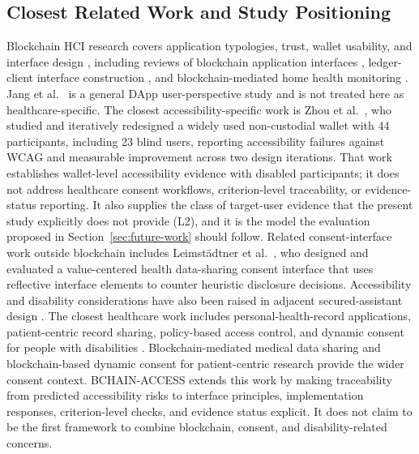\documentclass[journal]{IEEEtran}
\begin{document}
\subsection{Closest Related Work and Study Positioning}
Blockchain HCI research covers application typologies, trust, wallet usability, and interface design \cite{elsden2018making,frohlich2022blockchain,Glomann2019ImprovingTB,tharani2022ui}, including reviews of blockchain application interfaces \cite{tharatipyakul2021user}, ledger-client interface construction \cite{hossain2020designing}, and blockchain-mediated home health monitoring \cite{rahman2020natural}. Jang et al.~\cite{jang2020user} is a general DApp user-perspective study and is not treated here as healthcare-specific. The closest accessibility-specific work is Zhou et al.~\cite{zhou2023accessible}, who studied and iteratively redesigned a widely used non-custodial wallet with 44 participants, including 23 blind users, reporting accessibility failures against WCAG and measurable improvement across two design iterations. That work establishes wallet-level accessibility evidence with disabled participants; it does not address healthcare consent workflows, criterion-level traceability, or evidence-status reporting. It also supplies the class of target-user evidence that the present study explicitly does not provide (L2), and it is the model the evaluation proposed in Section~\ref{sec:future-work} should follow. Related consent-interface work outside blockchain includes Leimst\"adtner et al.~\cite{leimstadtner2024value}, who designed and evaluated a value-centered health data-sharing consent interface that uses reflective interface elements to counter heuristic disclosure decisions. Accessibility and disability considerations have also been raised in adjacent secured-assistant design \cite{alfayez2024user}. The closest healthcare work includes personal-health-record applications, patient-centric record sharing, policy-based access control, and dynamic consent for people with disabilities \cite{kim2022blockchain,dubovitskaya2020action,yaqub2025blockchain,khalid2023blockchain}. Blockchain-mediated medical data sharing \cite{taherdoost2023role} and blockchain-based dynamic consent for patient-centric research \cite{charles2024dynamic} provide the wider consent context. BCHAIN-ACCESS extends this work by making traceability from predicted accessibility risks to interface principles, implementation responses, criterion-level checks, and evidence status explicit. It does not claim to be the first framework to combine blockchain, consent, and disability-related concerns.
\end{document}
